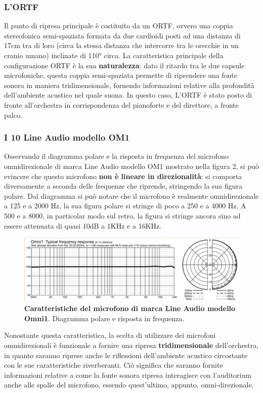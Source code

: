 \subsubsection{L'ORTF}
Il punto di ripresa principale è costituito da un ORTF, ovvero una coppia stereofonica semi-spaziata formata da due cardioidi posti ad una distanza di 17cm tra di loro (circa la stessa distanza che intercorre tra le orecchie in un cranio umano) inclinate di 110° circa.
La caratteristica principale della configurazione ORTF è la sua \textbf{naturalezza}: dato il ritardo tra le due capsule microfoniche, questa coppia semi-spaziata permette di riprendere una fonte sonora in maniera tridimensionale, fornendo informazioni relative alla profondità dell'ambiente acustico nel quale suona.
In questo caso, L'ORTF è stato posto di fronte all'orchestra in corrispondenza del pianoforte e del direttore, a fronte palco.

\subsubsection*{I 10 Line Audio modello OM1}
Osservando il diagramma polare e la risposta in frequenza del microfono omnidirezionale di marca Line Audio modello OM1 mostrato nella figura 2, si può evincere che questo microfono \textbf{non è lineare in direzionalità}: si comporta diversamente a seconda delle frequenze che riprende, stringendo la sua figura polare. Dal diagramma si può notare che il microfono è realmente omnidirezionale a 125 e a 2000 Hz, la sua figura polare si stringe di poco a 250 e a 4000 Hz. A 500 e a 8000, in particolar modo sul retro, la figura si stringe ancora sino ad essere attenuata di quasi 10dB a 1KHz e a 16KHz.

\begin{figure}[h]
	\begin{center}
		\includegraphics[width=.47\textwidth]{img/image1.png}
		\caption{\textbf{Caratteristiche del microfono di marca Line Audio modello Omni1}. Diagramma polare e risposta in frequenza.}
		\label{gr01}
	\end{center}
\end{figure}

Nonostante questa caratteristica, la scelta di utilizzare dei microfoni omnidirezionali è funzionale a fornire una ripresa \textbf{tridimensionale} dell'orchestra, in quanto saranno riprese anche le riflessioni dell'ambiente acustico circostante con le sue caratteristiche riverberanti. Ciò significa che saranno fornite informazioni relative a come la fonte sonora ripresa interagisce con l'auditorium anche alle spalle del microfono, essendo quest'ultimo, appunto, omni-direzionale.

